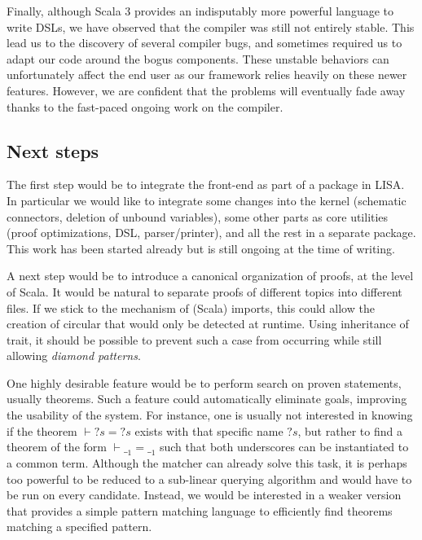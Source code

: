 Finally, although Scala 3 provides an indisputably more powerful language to write DSLs, we have observed that the compiler was still not entirely stable. This lead us to the discovery of several compiler bugs, and sometimes required us to adapt our code around the bogus components. These unstable behaviors can unfortunately affect the end user as our framework relies heavily on these newer features. However, we are confident that the problems will eventually fade away thanks to the fast-paced ongoing work on the compiler.

\subsection{Next steps}

The first step would be to integrate the front-end as part of a package in LISA. In particular we would like to integrate some changes into the kernel (schematic connectors, deletion of unbound variables), some other parts as core utilities (proof optimizations, DSL, parser/printer), and all the rest in a separate package. This work has been started already but is still ongoing at the time of writing.

A next step would be to introduce a canonical organization of proofs, at the level of Scala. It would be natural to separate proofs of different topics into different files. If we stick to the mechanism of (Scala) imports, this could allow the creation of circular that would only be detected at runtime. Using inheritance of trait, it should be possible to prevent such a case from occurring while still allowing \textit{diamond patterns}.

One highly desirable feature would be to perform search on proven statements, usually theorems. Such a feature could automatically eliminate goals, improving the usability of the system. For instance, one is usually not interested in knowing if the theorem $\vdash {?s} = {?s}$ exists with that specific name ${?s}$, but rather to find a theorem of the form $\vdash \__1 = \__1$ such that both underscores can be instantiated to a common term. Although the matcher can already solve this task, it is perhaps too powerful to be reduced to a sub-linear querying algorithm and would have to be run on every candidate. Instead, we would be interested in a weaker version that provides a simple pattern matching language to efficiently find theorems matching a specified pattern.
